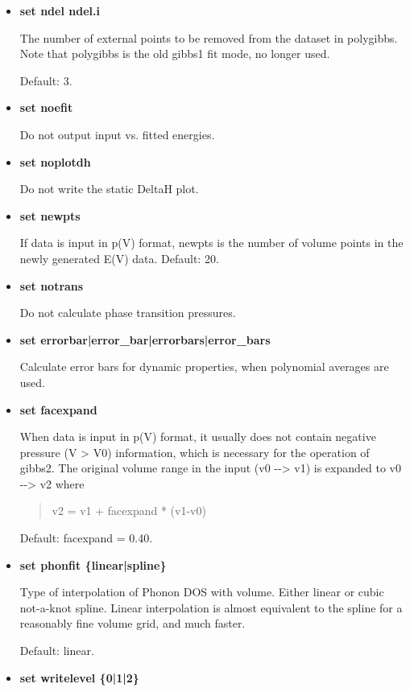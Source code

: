 \documentclass[a4paper]{article}
\begin{document}
\begin{itemize}
\item \textbf{set ndel ndel.i}

The number of external points to be removed from the dataset in
polygibbs. Note that polygibbs is the old gibbs1 fit mode, no longer
used.

Default: 3.

\item \textbf{set noefit}

Do not output input vs. fitted energies.

\item \textbf{set noplotdh}

Do not write the static DeltaH plot.

\item \textbf{set newpts}

If data is input in p(V) format, newpts is the number of volume
points in the newly generated E(V) data. Default: 20.

\item \textbf{set notrans}

Do not calculate phase transition pressures.

\item \textbf{set errorbar|error\_bar|errorbars|error\_bars}

Calculate error bars for dynamic properties, when polynomial
averages are used.

\item \textbf{set facexpand}

When data is input in p(V) format, it usually does not contain
negative pressure (V > V0) information, which is necessary for the
operation of gibbs2. The original volume range in the input (v0 -{}->
v1) is expanded to v0 -{}-> v2 where
%
\begin{quote}

v2 = v1 + facexpand * (v1-v0)

\end{quote}

Default: facexpand = 0.40.

\item \textbf{set phonfit \{linear|spline\}}

Type of interpolation of Phonon DOS with volume. Either linear or
cubic not-a-knot spline. Linear interpolation is almost equivalent
to the spline for a reasonably fine volume grid, and much faster.

Default: linear.

\item \textbf{set writelevel \{0|1|2\}}
%
\begin{itemize}


\end{itemize}
\end{itemize}
\end{document}
